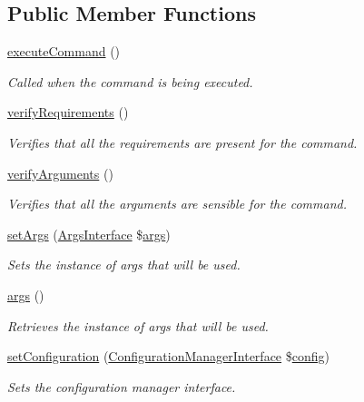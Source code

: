 \subsection*{Public Member Functions}
\begin{DoxyCompactItemize}
\item 
\hyperlink{interfaceRouterCommand_ab0eb6b733558c299ebe69e8b0199e9f6}{execute\-Command} ()
\begin{DoxyCompactList}\small\item\em Called when the command is being executed. \end{DoxyCompactList}\item 
\hyperlink{interfaceRouterCommand_a5f4860469bc1cb7ba4380bc27ffa2311}{verify\-Requirements} ()
\begin{DoxyCompactList}\small\item\em Verifies that all the requirements are present for the command. \end{DoxyCompactList}\item 
\hyperlink{interfaceRouterCommand_a59bbf54446926c2a47c3409c1c69891f}{verify\-Arguments} ()
\begin{DoxyCompactList}\small\item\em Verifies that all the arguments are sensible for the command. \end{DoxyCompactList}\item 
\hyperlink{interfaceArgsDependency_a254a16af37180b8d36e07d008c2f57f8}{set\-Args} (\hyperlink{interfaceArgsInterface}{Args\-Interface} \$\hyperlink{interfaceArgsDependency_a0f7b28344ad83bbab37c6a18ec74788d}{args})
\begin{DoxyCompactList}\small\item\em Sets the instance of args that will be used. \end{DoxyCompactList}\item 
\hyperlink{interfaceArgsDependency_a0f7b28344ad83bbab37c6a18ec74788d}{args} ()
\begin{DoxyCompactList}\small\item\em Retrieves the instance of args that will be used. \end{DoxyCompactList}\item 
\hyperlink{interfaceConfigurationDependency_a93b2f6f74680415c80eb4cd4fa3b3a82}{set\-Configuration} (\hyperlink{interfaceConfigurationManagerInterface}{Configuration\-Manager\-Interface} \$\hyperlink{interfaceConfigurationDependency_a66f2b69553fee58df04e4a439ed539f1}{config})
\begin{DoxyCompactList}\small\item\em Sets the configuration manager interface. \end{DoxyCompactList}\item 

\end{DoxyCompactItemize}
